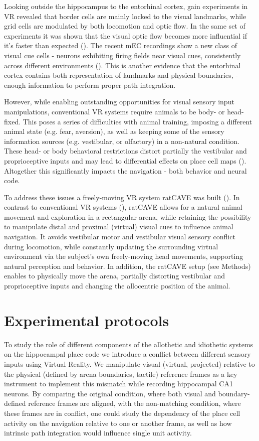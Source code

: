 Looking outside the hippocampus to the entorhinal cortex, gain experiments in VR revealed that border cells are mainly locked to the visual landmarks, while grid cells are modulated by both locomotion and optic flow. In the same set of experiments it was shown that the visual optic flow becomes more influential if it’s faster than expected (\cite{Campbell2018}). The recent mEC recordings show a new class of visual cue cells - neurons exhibiting firing fields near visual cues, consistently across different environments (\cite{Kinkhabwala2020}). This is another evidence that the entorhinal cortex contains both representation of landmarks and physical boundaries, - enough information to perform proper path integration.

However, while enabling outstanding opportunities for visual sensory input manipulations, conventional VR systems require animals to be body- or head-fixed. This poses a series of difficulties with animal training, imposing a different animal state (e.g. fear, aversion), as well as keeping some of the sensory information sources (e.g. vestibular, or olfactory) in a non-natural condition. These head- or body behavioral restrictions distort partially the vestibular and proprioceptive inputs and may lead to differential effects on place cell maps (\cite{Stackman2002}). Altogether this significantly impacts the navigation - both behavior and neural code.

To address these issues a freely-moving VR system ratCAVE was built (\cite{DelGrosso2018}). In contrast to conventional VR systems (\cite{Thurley2016}), ratCAVE allows for a natural animal movement and exploration in a rectangular arena, while retaining the possibility to manipulate distal and proximal (virtual) visual cues to influence animal navigation. It avoids vestibular motor and vestibular visual sensory conflict during locomotion, while constantly updating the surrounding virtual environment via the subject’s own freely-moving head movements, supporting natural perception and behavior. In addition, the ratCAVE setup (see Methods) enables to physically move the arena, partially distorting vestibular and proprioceptive inputs and changing the allocentric position of the animal.


\section{Experimental protocols}
\label{sec:protocols}

To study the role of different components of the allothetic and idiothetic systems on the hippocampal place code we introduce a conflict between different sensory inputs using Virtual Reality. We manipulate visual (virtual, projected) relative to the physical (defined by arena boundaries, tactile) reference frames as a key instrument to implement this mismatch while recording hippocampal CA1 neurons. By comparing the original condition, where both visual and boundary-defined reference frames are aligned, with the non-matching condition, where these frames are in conflict, one could study the dependency of the place cell activity on the navigation relative to one or another frame, as well as how intrinsic path integration would influence single unit activity.

